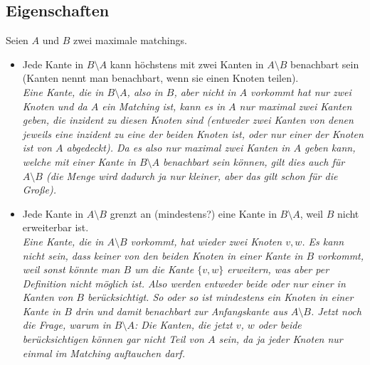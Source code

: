 \documentclass[paper=a4,10pt]{scrartcl}
\begin{document}
\subsection{Eigenschaften}
Seien $A$ und $B$ zwei maximale matchings. 

\begin{itemize}
\item Jede Kante in $B \setminus A$ kann höchstens mit zwei Kanten in $A \setminus B$ benachbart sein (Kanten nennt man benachbart, wenn sie einen Knoten teilen). \\
\textit{Eine Kante, die in $B \setminus A$, also in $B$, aber nicht in $A$ vorkommt hat nur zwei Knoten und da $A$ ein Matching ist, kann es in $A$ nur maximal zwei Kanten geben, die inzident zu diesen Knoten sind (entweder zwei Kanten von denen jeweils eine inzident zu eine der beiden Knoten ist, oder nur einer der Knoten ist von $A$ abgedeckt). Da es also nur maximal zwei Kanten in $A$ geben kann, welche mit einer Kante in $B \setminus A$ benachbart sein können, gilt dies auch für $A \setminus B$ (die Menge wird dadurch ja nur kleiner, aber das gilt schon für die Große).}

\item Jede Kante in $A \setminus B$ grenzt an (mindestens?) eine Kante in $B \setminus A$, weil $B$ nicht erweiterbar ist.\\
\textit{Eine Kante, die in $A \setminus B$ vorkommt, hat wieder zwei Knoten $v, w$. Es kann nicht sein, dass keiner von den beiden Knoten in einer Kante in $B$ vorkommt, weil sonst könnte man $B$ um die Kante $\{v, w\}$ erweitern, was aber per Definition nicht möglich ist. Also werden entweder beide oder nur einer in Kanten von $B$ berücksichtigt. So oder so ist mindestens ein Knoten in einer Kante in $B$ drin und damit benachbart zur Anfangskante aus $A \setminus B$. Jetzt noch die Frage, warum in $B\setminus A$: Die Kanten, die jetzt $v$, $w$ oder beide berücksichtigen können gar nicht Teil von $A$ sein, da ja jeder Knoten nur einmal im Matching auftauchen darf.}
\end{itemize}
\end{document}
